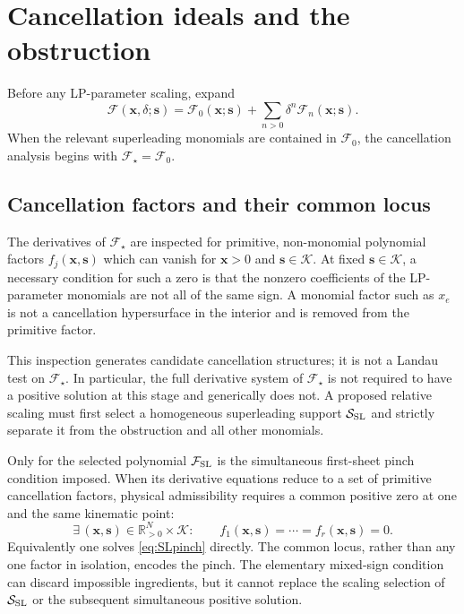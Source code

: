 \documentclass[a4paper,11pt]{article}
\newcommand{\x}{\boldsymbol{x}}
\newcommand{\s}{\boldsymbol{s}}
\newcommand{\K}{\mathcal K}
\newcommand{\FSL}{\mathcal F_{\rm SL}}
\newcommand{\SSL}{\mathcal S_{\rm SL}}
\newcommand{\Rpos}{\mathbb R_{>0}}
\begin{document}
\section{Cancellation ideals and the obstruction}
\label{sec:ordinary}

Before any LP-parameter scaling, expand
\begin{equation}
 \mathcal F(\x,\delta;\s)
 =
 \mathcal F_0(\x;\s)
 +\sum_{n>0}\delta^n\mathcal F_n(\x;\s).
\label{eq:Fexpansion}
\end{equation}
When the relevant superleading monomials are contained in
\(\mathcal F_0\), the cancellation analysis begins with
\(\mathcal F_\star=\mathcal F_0\).

\subsection{Cancellation factors and their common locus}

The derivatives of \(\mathcal F_\star\) are inspected for primitive,
non-monomial polynomial factors \(f_j(\x,\s)\) which can vanish for
\(\x>0\) and \(\s\in\K\).  At fixed \(\s\in\K\), a necessary condition
for such a zero is that the nonzero coefficients of the LP-parameter
monomials are not all of the same sign.  A
monomial factor such as \(x_e\) is not a cancellation hypersurface in the
interior and is removed from the primitive factor.

This inspection generates candidate cancellation structures; it is not a
Landau test on \(\mathcal F_\star\).  In particular, the full derivative
system of \(\mathcal F_\star\) is not required to have a positive solution at
this stage and generically does not.  A proposed relative scaling must first
select a homogeneous superleading support \(\SSL\) and strictly separate it
from the obstruction and all other monomials.

Only for the selected polynomial \(\FSL\) is the simultaneous first-sheet
pinch condition imposed.  When its derivative equations reduce to a set of
primitive cancellation factors, physical admissibility requires a common
positive zero at one and the same kinematic point:
\begin{equation}
 \exists\,(\x,\s)\in\Rpos^N\times\K:
 \qquad f_1(\x,\s)=\cdots=f_r(\x,\s)=0.
\label{eq:commonzero}
\end{equation}
Equivalently one solves \eqref{eq:SLpinch} directly.  The common locus,
rather than any one factor in isolation, encodes the pinch.  The elementary
mixed-sign condition can discard impossible ingredients, but it cannot
replace the scaling selection of \(\SSL\) or the subsequent simultaneous
positive solution.
\end{document}
